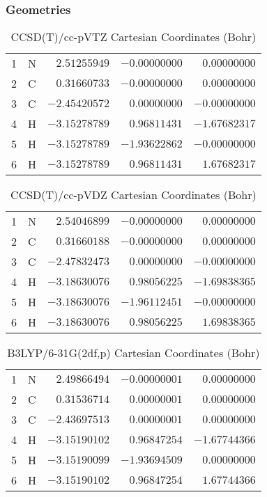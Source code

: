\documentclass[10pt,oneside]{article}
\begin{document}
\clearpage

\subsection{\ \ \ }

\subsubsection*{Geometries}
\begin{table}[h!]
\centering
\caption{CCSD(T)/cc-pVTZ Cartesian Coordinates (Bohr)}
\begin{tabular}{llrrr}
1  & N  & $ 2.51255949$ & $-0.00000000$ & $ 0.00000000$ \\
2  & C  & $ 0.31660733$ & $-0.00000000$ & $ 0.00000000$ \\
3  & C  & $-2.45420572$ & $ 0.00000000$ & $-0.00000000$ \\
4  & H  & $-3.15278789$ & $ 0.96811431$ & $-1.67682317$ \\
5  & H  & $-3.15278789$ & $-1.93622862$ & $-0.00000000$ \\
6  & H  & $-3.15278789$ & $ 0.96811431$ & $ 1.67682317$ \\
\end{tabular}
\end{table}

\begin{table}[h!]
\centering
\caption{CCSD(T)/cc-pVDZ Cartesian Coordinates (Bohr)}
\begin{tabular}{llrrr}
1  & N  & $ 2.54046899$ & $-0.00000000$ & $ 0.00000000$ \\
2  & C  & $ 0.31660188$ & $-0.00000000$ & $ 0.00000000$ \\
3  & C  & $-2.47832473$ & $ 0.00000000$ & $-0.00000000$ \\
4  & H  & $-3.18630076$ & $ 0.98056225$ & $-1.69838365$ \\
5  & H  & $-3.18630076$ & $-1.96112451$ & $-0.00000000$ \\
6  & H  & $-3.18630076$ & $ 0.98056225$ & $ 1.69838365$ \\
\end{tabular}
\end{table}

\begin{table}[h!]
\centering
\caption{B3LYP/6-31G(2df,p) Cartesian Coordinates (Bohr)}
\begin{tabular}{llrrr}
1  & N  & $ 2.49866494$ & $-0.00000001$ & $ 0.00000000$ \\
2  & C  & $ 0.31536714$ & $ 0.00000001$ & $ 0.00000000$ \\
3  & C  & $-2.43697513$ & $ 0.00000001$ & $ 0.00000000$ \\
4  & H  & $-3.15190102$ & $ 0.96847254$ & $-1.67744366$ \\
5  & H  & $-3.15190099$ & $-1.93694509$ & $ 0.00000000$ \\
6  & H  & $-3.15190102$ & $ 0.96847254$ & $ 1.67744366$ \\
\end{tabular}
\end{table}
\end{document}
